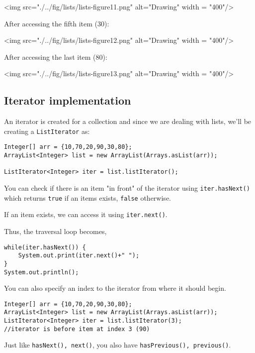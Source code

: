<img src="./../fig/lists/lists-figure11.png" alt="Drawing" width = "400"/>

\vskip 1mm

After accessing the fifth item (30):
\vskip 1mm

<img src="./../fig/lists/lists-figure12.png" alt="Drawing" width = "400"/>

\vskip 1mm
				
After accessing the last item (80):
\vskip 1mm

<img src="./../fig/lists/lists-figure13.png" alt="Drawing" width = "400"/>

\newpage

\subsection{Iterator implementation}

An iterator is created for a collection and since we are dealing with lists, we'll be creating a \texttt{ListIterator} as:

\begin{lstlisting}
Integer[] arr = {10,70,20,90,30,80};
ArrayList<Integer> list = new ArrayList(Arrays.asList(arr));

ListIterator<Integer> iter = list.listIterator();
\end{lstlisting}

You can check if there is an item "in front" of the iterator using \texttt{iter.hasNext()} which returns \texttt{true} if an items exists, \texttt{false} otherwise.

If an item exists, we can access it using \texttt{iter.next()}.

Thus, the traversal loop becomes,

\begin{lstlisting}
while(iter.hasNext()) {
	System.out.print(iter.next()+" ");
}
System.out.println();
\end{lstlisting}

You can also specify an index to the iterator from where it should begin.

\begin{lstlisting}
Integer[] arr = {10,70,20,90,30,80};
ArrayList<Integer> list = new ArrayList(Arrays.asList(arr));
ListIterator<Integer> iter = list.listIterator(3); 
//iterator is before item at index 3 (90)
\end{lstlisting}

Just like \texttt{hasNext(), next()}, you also have \texttt{hasPrevious(), previous()}.

